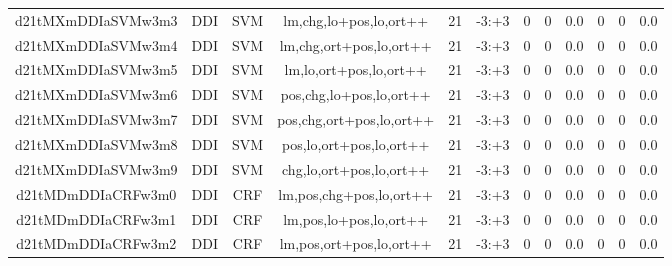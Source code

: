 \documentclass[a4paper]{article}
\begin{document}
\begin{landscape}
\begin{center}
\begin{tabular}{ |c|c|c|c|c|c|c|c|c|c|c|c|}
 
 	
 	\small{ d21tMXmDDIaSVMw3m3 } & \small{ DDI} & \small{  SVM }  & lm,chg,lo+pos,lo,ort++  &  21 &  \small{  -3:+3 }  &  0 & 0 & 0.0  &  0 & 0 & 0.0 \\
 	

 
 	
 	\small{ d21tMXmDDIaSVMw3m4 } & \small{ DDI} & \small{  SVM }  & lm,chg,ort+pos,lo,ort++  &  21 &  \small{  -3:+3 }  &  0 & 0 & 0.0  &  0 & 0 & 0.0 \\
 	

 
 	
 	\small{ d21tMXmDDIaSVMw3m5 } & \small{ DDI} & \small{  SVM }  & lm,lo,ort+pos,lo,ort++  &  21 &  \small{  -3:+3 }  &  0 & 0 & 0.0  &  0 & 0 & 0.0 \\
 	

 
 	
 	\small{ d21tMXmDDIaSVMw3m6 } & \small{ DDI} & \small{  SVM }  & pos,chg,lo+pos,lo,ort++  &  21 &  \small{  -3:+3 }  &  0 & 0 & 0.0  &  0 & 0 & 0.0 \\
 	

 
 	
 	\small{ d21tMXmDDIaSVMw3m7 } & \small{ DDI} & \small{  SVM }  & pos,chg,ort+pos,lo,ort++  &  21 &  \small{  -3:+3 }  &  0 & 0 & 0.0  &  0 & 0 & 0.0 \\
 	

 
 	
 	\small{ d21tMXmDDIaSVMw3m8 } & \small{ DDI} & \small{  SVM }  & pos,lo,ort+pos,lo,ort++  &  21 &  \small{  -3:+3 }  &  0 & 0 & 0.0  &  0 & 0 & 0.0 \\
 	

 
 	
 	\small{ d21tMXmDDIaSVMw3m9 } & \small{ DDI} & \small{  SVM }  & chg,lo,ort+pos,lo,ort++  &  21 &  \small{  -3:+3 }  &  0 & 0 & 0.0  &  0 & 0 & 0.0 \\
 	

 
 	
 	\small{ d21tMDmDDIaCRFw3m0 } & \small{ DDI} & \small{  CRF }  & lm,pos,chg+pos,lo,ort++  &  21 &  \small{  -3:+3 }  &  0 & 0 & 0.0  &  0 & 0 & 0.0 \\
 	

 
 	
 	\small{ d21tMDmDDIaCRFw3m1 } & \small{ DDI} & \small{  CRF }  & lm,pos,lo+pos,lo,ort++  &  21 &  \small{  -3:+3 }  &  0 & 0 & 0.0  &  0 & 0 & 0.0 \\
 	

 
 	
 	\small{ d21tMDmDDIaCRFw3m2 } & \small{ DDI} & \small{  CRF }  & lm,pos,ort+pos,lo,ort++  &  21 &  \small{  -3:+3 }  &  0 & 0 & 0.0  &  0 & 0 & 0.0 \\
 	


\end{tabular}
\end{center}
\end{landscape}
\end{document}
